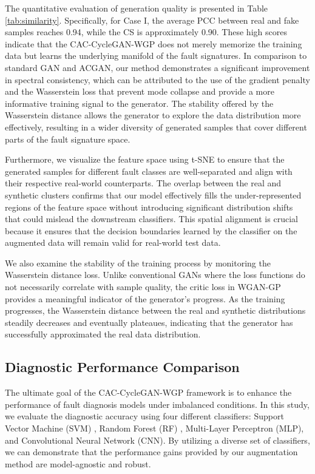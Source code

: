The quantitative evaluation of generation quality is presented in Table \ref{tab:similarity}. Specifically, for Case I, the average PCC between real and fake samples reaches 0.94, while the CS is approximately 0.90. These high scores indicate that the CAC-CycleGAN-WGP does not merely memorize the training data but learns the underlying manifold of the fault signatures. In comparison to standard GAN and ACGAN, our method demonstrates a significant improvement in spectral consistency, which can be attributed to the use of the gradient penalty and the Wasserstein loss that prevent mode collapse and provide a more informative training signal to the generator. The stability offered by the Wasserstein distance allows the generator to explore the data distribution more effectively, resulting in a wider diversity of generated samples that cover different parts of the fault signature space.

Furthermore, we visualize the feature space using t-SNE \cite{Maaten2008} to ensure that the generated samples for different fault classes are well-separated and align with their respective real-world counterparts. The overlap between the real and synthetic clusters confirms that our model effectively fills the under-represented regions of the feature space without introducing significant distribution shifts that could mislead the downstream classifiers. This spatial alignment is crucial because it ensures that the decision boundaries learned by the classifier on the augmented data will remain valid for real-world test data.

We also examine the stability of the training process by monitoring the Wasserstein distance loss. Unlike conventional GANs where the loss functions do not necessarily correlate with sample quality, the critic loss in WGAN-GP provides a meaningful indicator of the generator's progress. As the training progresses, the Wasserstein distance between the real and synthetic distributions steadily decreases and eventually plateaues, indicating that the generator has successfully approximated the real data distribution.

\subsection{Diagnostic Performance Comparison}
The ultimate goal of the CAC-CycleGAN-WGP framework is to enhance the performance of fault diagnosis models under imbalanced conditions. In this study, we evaluate the diagnostic accuracy using four different classifiers: Support Vector Machine (SVM) \cite{Cortes1995}, Random Forest (RF) \cite{Breiman2001}, Multi-Layer Perceptron (MLP), and Convolutional Neural Network (CNN). By utilizing a diverse set of classifiers, we can demonstrate that the performance gains provided by our augmentation method are model-agnostic and robust.

